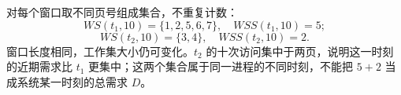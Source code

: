 \begin{checkedsolution}
对每个窗口取不同页号组成集合，不重复计数：
\[
  WS(t_1,10)=\{1,2,5,6,7\},\quad WSS(t_1,10)=5;
\]
\[
  WS(t_2,10)=\{3,4\},\quad WSS(t_2,10)=2.
\]
窗口长度相同，工作集大小仍可变化。$t_2$ 的十次访问集中于两页，说明这一时刻的近期需求比 $t_1$ 更集中；这两个集合属于同一进程的不同时刻，不能把 $5+2$ 当成系统某一时刻的总需求 $D$。
\end{checkedsolution}
\endgroup
